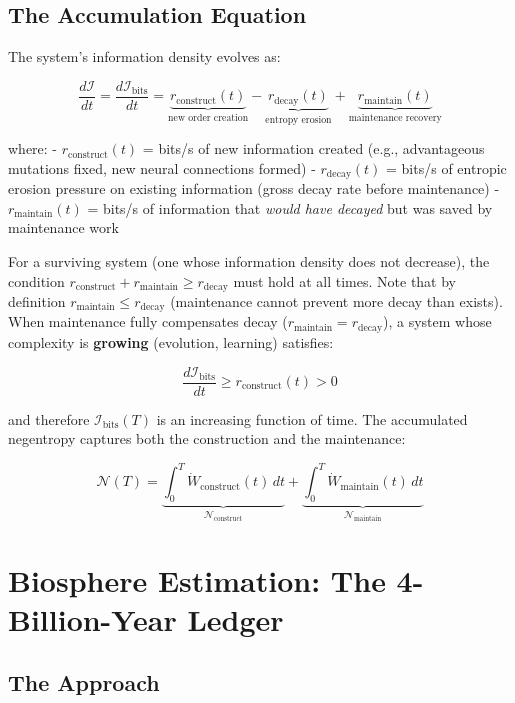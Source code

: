 \documentclass[11pt]{article}
\theoremstyle{plain}
\theoremstyle{definition}
\theoremstyle{remark}
\let\origsection\section
\renewcommand{\section}{\needspace{12\baselineskip}\origsection}
\let\origsubsection\subsection
\renewcommand{\subsection}{\needspace{7\baselineskip}\origsubsection}
\begin{document}
\subsection{The Accumulation Equation}\label{the-accumulation-equation}

The system's information density evolves as:

\[\frac{d \mathcal{I}}{dt} = \frac{d \mathcal{I}_{\text{bits}}}{dt} = \underbrace{r_{\text{construct}}(t)}_{\text{new order creation}} - \underbrace{r_{\text{decay}}(t)}_{\text{entropy erosion}} + \underbrace{r_{\text{maintain}}(t)}_{\text{maintenance recovery}}\]

where: - \(r_{\text{construct}}(t)\) = bits/s of new information created
(e.g., advantageous mutations fixed, new neural connections formed) -
\(r_{\text{decay}}(t)\) = bits/s of entropic erosion pressure on
existing information (gross decay rate before maintenance) -
\(r_{\text{maintain}}(t)\) = bits/s of information that \emph{would have
decayed} but was saved by maintenance work

For a surviving system (one whose information density does not
decrease), the condition
\(r_{\text{construct}} + r_{\text{maintain}} \geq r_{\text{decay}}\)
must hold at all times. Note that by definition
\(r_{\text{maintain}} \leq r_{\text{decay}}\) (maintenance cannot
prevent more decay than exists). When maintenance fully compensates
decay (\(r_{\text{maintain}} = r_{\text{decay}}\)), a system whose
complexity is \textbf{growing} (evolution, learning) satisfies:

\[\frac{d \mathcal{I}_{\text{bits}}}{dt} \geq r_{\text{construct}}(t) > 0\]

and therefore \(\mathcal{I}_{\text{bits}}(T)\) is an increasing function
of time. The accumulated negentropy captures both the construction and
the maintenance:

\[\mathcal{N}(T) = \underbrace{\int_0^T \dot{W}_{\text{construct}}(t) \, dt}_{\mathcal{N}_{\text{construct}}} + \underbrace{\int_0^T \dot{W}_{\text{maintain}}(t) \, dt}_{\mathcal{N}_{\text{maintain}}}\]

\section{Biosphere Estimation: The 4-Billion-Year
Ledger}\label{biosphere-estimation-the-4-billion-year-ledger}

\subsection{The Approach}\label{the-approach}
\end{document}
